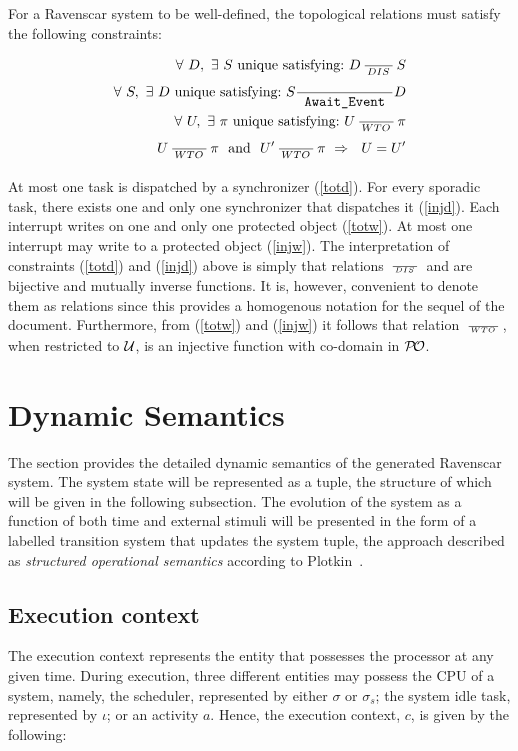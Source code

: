 For a Ravenscar system to be well-defined, the topological relations
must satisfy the following constraints:

\begin{eqnarray}
\label{totd} \forall \ D, \ \exists  \ S \  \text{unique satisfying:} \ D \RL{DIS} S  \\
\label{injd} \forall \ S, \ \exists  \ D \  \text{unique satisfying:} \ S \rgvt D \\
\label{totw}\ \forall \ U, \ \exists \ \pi \  \text{unique satisfying:} \ U \RL{WTO} \pi \\
\label{injw} \ U \RL{WTO} \pi \ \ \text{and} \  \ U' \RL{WTO} \pi \ \Rightarrow \  \ U=U'
\end{eqnarray}

At most one task is dispatched by a synchronizer (\ref{totd}). For
every sporadic task, there exists one and only one synchronizer that
dispatches it (\ref{injd}). Each interrupt writes on one and
only one protected object (\ref{totw}). At most one interrupt
may write to a protected object (\ref{injw}). The
interpretation of constraints (\ref{totd}) and (\ref{injd}) above is
simply that relations $\,\frac{}{\,^{{DIS}}\,}\,$ and \rgvt are bijective and mutually
inverse functions. It is, however, convenient to denote them as
relations since this provides a homogenous notation  for the sequel of
the document. Furthermore, from (\ref{totw}) and (\ref{injw}) it
follows that relation $\,\frac{}{\,^{{WTO}}\,}\,$, when restricted to ${\cal U}$, is an
injective function with co-domain in ${\cal P\!O}$.

\section{Dynamic Semantics}
\label{sec:dynamic_semantics}
The section provides the detailed dynamic semantics of the generated
Ravenscar system. The system state will be represented as a tuple,
the structure of which will be given in the following subsection. The
evolution of the system as a function of both time and external
stimuli will be presented in the form of a labelled transition system
that updates the system tuple, the approach described as
\emph{structured operational semantics} according to
Plotkin~\cite{plotkin-sos}.

\subsection{Execution context}
The execution context represents the entity that possesses the
processor at any given time. During execution, three different
entities may possess the CPU of a system, namely, the scheduler,
represented by either $\sigma$ or $\sigma_s$; the system idle task,
represented by $\iota$; or an activity $a$. Hence, the execution
context, $c$, is given by the following:

